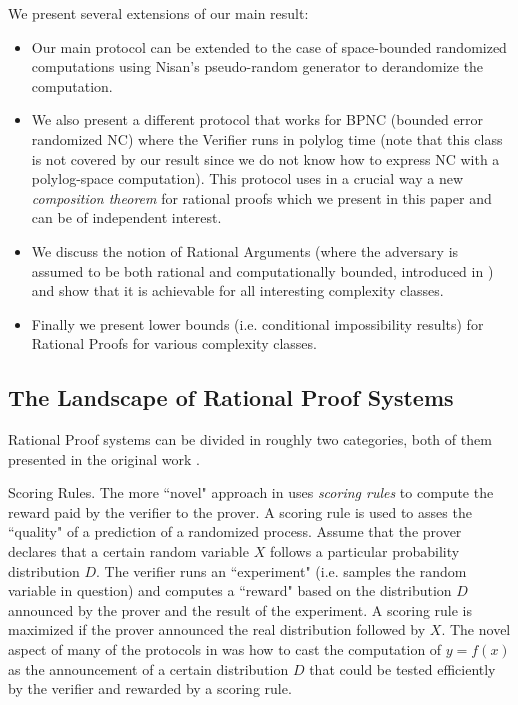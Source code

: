 We present several extensions of our main result:
\begin{itemize}

	\item Our main protocol can be extended to the case of space-bounded randomized computations using Nisan's 
	pseudo-random generator \cite{nisan1992pseudorandom} to derandomize the computation. 
	\item We also present a different protocol that works for BPNC (bounded error randomized NC) where the Verifier runs in polylog time (note that this class is not covered by our result since we do not know how to express NC with a polylog-space computation). This protocol uses in a crucial way a new {\em composition theorem} for rational proofs which we present in this paper and can be of independent interest. 
	\item We discuss the notion of Rational Arguments (where the adversary is assumed to be both rational and computationally bounded, introduced in \cite{ratargs}) and show that it is achievable for all interesting complexity classes.
	\item Finally we present lower bounds (i.e. conditional impossibility results) for Rational Proofs for various complexity classes.
\end{itemize}

\subsection{The Landscape of Rational Proof Systems}

Rational Proof systems can be divided in roughly two categories, both of them presented in the original work \cite{am}. 

\medskip
\noindent
{\sc Scoring Rules.}
The more ``novel" approach in \cite{am} uses {\em scoring rules} to compute the reward paid by the verifier to the prover. A scoring rule is used to asses the ``quality" of a prediction of a randomized process. Assume that the prover declares that a certain random variable $X$ follows a particular probability distribution $D$. The verifier runs an ``experiment" (i.e. samples the random variable in question) and computes a ``reward" based on the distribution $D$ announced by the prover and the result of the experiment. A scoring rule is maximized if the prover announced the real distribution followed by $X$. The novel aspect of many of the protocols in \cite{am} was how to cast the computation of $y=f(x)$ as the announcement of a certain distribution $D$ that could be tested efficiently by the verifier and rewarded by a scoring rule. 

